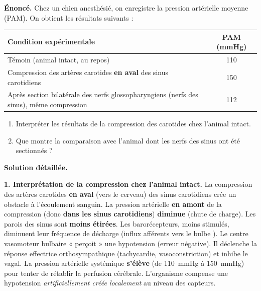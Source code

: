 \documentclass[11pt]{article}
\begin{document}
\begin{exoresolu}
\textbf{Énoncé.} Chez un chien anesthésié, on enregistre la pression artérielle moyenne (PAM). On obtient les résultats suivants :

\begin{center}
\begin{tabular}{|l|c|}
\hline
\rowcolor{popblueL} \textbf{Condition expérimentale} & \textbf{PAM (mmHg)} \\
\hline
Témoin (animal intact, au repos) & 110 \\
\hline
Compression des artères carotides \textbf{en aval} des sinus carotidiens & 150 \\
\hline
Après section bilatérale des nerfs glossopharyngiens (nerfs des sinus), même compression & 112 \\
\hline
\end{tabular}
\end{center}

\begin{enumerate}
\item Interpréter les résultats de la compression des carotides chez l'animal intact.
\item Que montre la comparaison avec l'animal dont les nerfs des sinus ont été sectionnés ?
\end{enumerate}

\tcblower
\textbf{Solution détaillée.}

\textbf{1. Interprétation de la compression chez l'animal intact.}
La compression des artères carotides \textbf{en aval} (vers le cerveau) des sinus carotidiens crée un obstacle à l'écoulement sanguin. La pression artérielle \textbf{en amont} de la compression (donc \textbf{dans les sinus carotidiens}) \textbf{diminue} (chute de charge). Les parois des sinus sont \textbf{moins étirées}. Les barorécepteurs, moins stimulés, diminuent leur fréquence de décharge (influx afférents vers le bulbe \textdownarrow).
Le centre vasomoteur bulbaire « perçoit » une hypotension (erreur négative). Il déclenche la réponse effectrice orthosympathique (tachycardie, vasoconstriction) et inhibe le vagal. La pression artérielle systémique \textbf{s'élève} (de \SI{110}{mmHg} à \SI{150}{mmHg}) pour tenter de rétablir la perfusion cérébrale. L'organisme compense une hypotension \emph{artificiellement créée localement} au niveau des capteurs.


\end{exoresolu}
\end{document}

